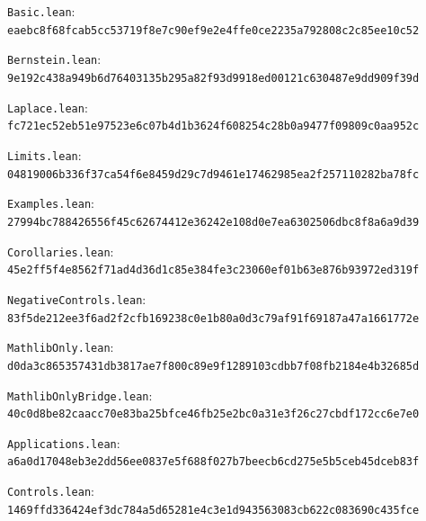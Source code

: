 \item \texttt{Basic.lean}: \texttt{eaebc8f68fcab5cc53719f8e7c90ef9e2e4ffe0ce2235a792808c2c85ee10c52}
\item \texttt{Bernstein.lean}: \texttt{9e192c438a949b6d76403135b295a82f93d9918ed00121c630487e9dd909f39d}
\item \texttt{Laplace.lean}: \texttt{fc721ec52eb51e97523e6c07b4d1b3624f608254c28b0a9477f09809c0aa952c}
\item \texttt{Limits.lean}: \texttt{04819006b336f37ca54f6e8459d29c7d9461e17462985ea2f257110282ba78fc}
\item \texttt{Examples.lean}: \texttt{27994bc788426556f45c62674412e36242e108d0e7ea6302506dbc8f8a6a9d39}
\item \texttt{Corollaries.lean}: \texttt{45e2ff5f4e8562f71ad4d36d1c85e384fe3c23060ef01b63e876b93972ed319f}
\item \texttt{NegativeControls.lean}: \texttt{83f5de212ee3f6ad2f2cfb169238c0e1b80a0d3c79af91f69187a47a1661772e}
\item \texttt{MathlibOnly.lean}: \texttt{d0da3c865357431db3817ae7f800c89e9f1289103cdbb7f08fb2184e4b32685d}
\item \texttt{MathlibOnlyBridge.lean}: \texttt{40c0d8be82caacc70e83ba25bfce46fb25e2bc0a31e3f26c27cbdf172cc6e7e0}
\item \texttt{Applications.lean}: \texttt{a6a0d17048eb3e2dd56ee0837e5f688f027b7beecb6cd275e5b5ceb45dceb83f}
\item \texttt{Controls.lean}: \texttt{1469ffd336424ef3dc784a5d65281e4c3e1d943563083cb622c083690c435fce}
